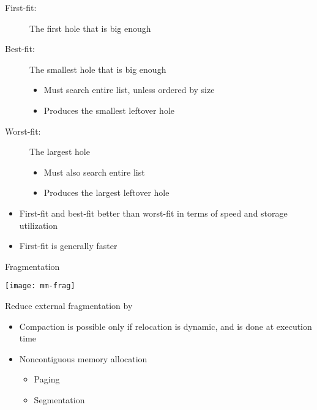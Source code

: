\begin{frame}%
  \begin{description}
  \item[First-fit:] The first hole that is big enough
  \item[Best-fit:] The smallest hole that is big enough
    \begin{itemize}
    \item Must search entire list, unless ordered by size
    \item Produces the smallest leftover hole
    \end{itemize}
  \item[Worst-fit:] The largest hole
    \begin{itemize}
    \item Must also search entire list
    \item Produces the largest leftover hole
    \end{itemize}
  \end{description}
  \begin{itemize}
  \item First-fit and best-fit better than worst-fit in terms of speed and storage
    utilization
  \item First-fit is generally faster
  \end{itemize}
\end{frame}

\begin{frame}{Fragmentation}
  \begin{varwidth}{.3\textwidth}
    \texttt{[image: mm-frag]}
  \end{varwidth}\hfill
  \begin{varwidth}{.66\textwidth}
    \begin{iblock}{Reduce external fragmentation by}
      \begin{itemize}
      \item \alert{Compaction} is possible only if relocation is dynamic,
        and is done at execution time
      \item \alert{Noncontiguous memory allocation}
        \begin{itemize}
        \item Paging
        \item Segmentation
        \end{itemize}
      \end{itemize}
    \end{iblock}
  \end{varwidth}
\end{frame}

